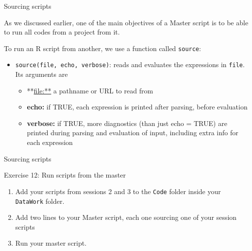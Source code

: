 \documentclass[ignorenonframetext,]{beamer}
\begin{document}
\begin{frame}[fragile]{Sourcing scripts}

As we discussed earlier, one of the main objectives of a Master script
is to be able to run all codes from a project from it.

To run an R script from another, we use a function called
\texttt{source}:

\begin{itemize}
\item
  \texttt{source(file,\ echo,\ verbose)}: reads and evaluates the
  expressions in \texttt{file}. Its arguments are

  \begin{itemize}
  \item
    **\url{file:**} a pathname or URL to read from
  \item
    \textbf{echo:} if TRUE, each expression is printed after parsing,
    before evaluation
  \item
    \textbf{verbose:} if TRUE, more diagnostics (than just echo = TRUE)
    are printed during parsing and evaluation of input, including extra
    info for each expression
  \end{itemize}
\end{itemize}

\end{frame}

\begin{frame}[fragile]{Sourcing scripts}

\begin{block}{Exercise 12: Run scripts from the master}

\begin{enumerate}
\def\labelenumi{\arabic{enumi}.}
\item
  Add your scripts from sessions 2 and 3 to the \texttt{Code} folder
  inside your \texttt{DataWork} folder.
\item
  Add two lines to your Master script, each one sourcing one of your
  session scripts
\item
  Run your master script.
\end{enumerate}

\end{block}

\end{frame}
\end{document}
